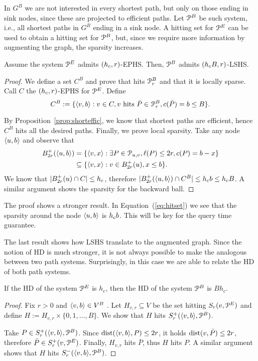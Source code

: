 In $G^B$ we are not interested in every shortest path, but only on those ending in sink nodes, since these are projected to efficient paths. 
Let $\mathcal{P}^B$ be such system, i.e., all shortest paths in $G^B$ ending in a sink node.
A hitting set for $\mathcal{P}^E$ can be used to obtain a hitting set for $\mathcal{P}^B$, but, since we require more information by augmenting the graph, the sparsity increases.
 
\begin{proposition}
Assume the system $\mathcal{P}^E$ admits $(h_c,r)$-EPHS.
Then, $\mathcal{P}^B$ admits $(h_c B,r)$-LSHS.
\end{proposition}
\begin{proof}
We define a set $C^B$ and prove that hits $\mathcal{P}_r^B$ and that it is locally sparse.
Call $C$ the $(h_c,r)$-EPHS for $\mathcal{P}^E$.
Define
\begin{equation}\label{eq:hitset}
C^B:=\{\langle v,b\rangle: v\in C, v \text{ hits }\bar P\in\mathcal{P}_r^B, c(\bar P)=b\leq B \}.
\end{equation}

By Proposition~\ref{prop:shorteffic}, we know that shortest paths are efficient, hence $C^B$ hits all the desired paths.
Finally, we prove local sparsity.
Take any node $\langle u,b\rangle$ and observe that
\begin{align*}
B^+_{2r}(\langle u,b\rangle) &= \{\langle v,x\rangle: \exists P\in\mathcal{P}_{u,v}, \ell(P)\leq 2r, c(P)=b-x\} \\
&\subseteq \{\langle v,x\rangle: v\in B^+_{2r}(u), x\leq b\} .
\end{align*}
We know that $\lvert B^+_{2r}(u)\cap C\rvert\leq h_c$, therefore $\lvert B^+_{2r}(\langle u,b\rangle)\cap C^B\rvert\leq h_c b\leq h_c B$.
A similar argument shows the sparsity for the backward ball.
\end{proof}

\begin{remark}
The proof shows a stronger result.
In Equation~(\ref{eq:hitset}) we see that the sparsity around the node $\langle u,b\rangle$ is $h_c b$.
This will be key for the query time guarantee.
\end{remark}

The last result shows how LSHS translate to the augmented graph.
Since the notion of HD is much stronger, it is not always possible to make the analogous between two path systems.
Surprisingly, in this case we are able to relate the HD of both path systems.

\begin{proposition}\label{prop:HDaugmented}
If the HD of the system $\mathcal{P}^E$ is $h_c$, then the HD of the system $\mathcal{P}^B$ is $Bh_c$.
\end{proposition}
\begin{proof}
Fix $r>0$ and $\langle v,b\rangle\in V^B$ .
Let $H_{v,r}\subseteq V$ be the set hitting $S_r(v,\mathcal{P}^E)$ and define $H:=H_{v,r}\times\{0,1,\ldots,B\}$.
We show that $H$ hits $S^+_r(\langle v,b\rangle,\mathcal{P}^B)$.

Take $P\in S^+_r(\langle v,b\rangle,\mathcal{P}^B)$.
Since $\text{dist}(\langle v,b\rangle,P)\leq 2r$, it holds $\text{dist}(v,\bar P)\leq 2r$, therefore $\bar P\in S^+_r(v,\mathcal{P}^E)$.
Finally, $H_{v,r}$ hits $\bar P$, thus $H$ hits $P$.
A similar argument shows that $H$ hits $S^-_r(\langle v,b\rangle,\mathcal{P}^B)$.
\end{proof}
